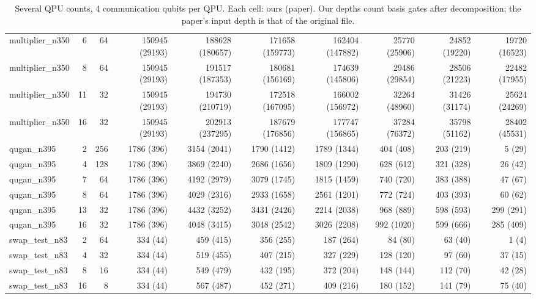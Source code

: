 \begin{table}[ht]
\begin{tabular}{lrrrrrrrrr}
multiplier\_n350 & 6 & 64 & 150945 (29193) & 188628 (180657) & 171658 (159773) & 162404 (147882) & 25770 (25906) & 24852 (19220) & 19720 (16523) \\
multiplier\_n350 & 8 & 64 & 150945 (29193) & 191517 (187353) & 180681 (156169) & 174639 (145806) & 29486 (29854) & 28506 (21223) & 22482 (17955) \\
multiplier\_n350 & 11 & 32 & 150945 (29193) & 194730 (210719) & 172518 (167095) & 166002 (156972) & 32264 (48960) & 31426 (31174) & 25624 (24269) \\
multiplier\_n350 & 16 & 32 & 150945 (29193) & 202913 (237295) & 187679 (176856) & 177747 (156865) & 37284 (76372) & 35798 (51162) & 28402 (45531) \\
qugan\_n395 & 2 & 256 & 1786 (396) & 3154 (2041) & 1790 (1412) & 1789 (1344) & 404 (408) & 203 (219) & 5 (29) \\
qugan\_n395 & 4 & 128 & 1786 (396) & 3869 (2240) & 2686 (1656) & 1809 (1290) & 628 (612) & 321 (328) & 26 (42) \\
qugan\_n395 & 7 & 64 & 1786 (396) & 4192 (2979) & 3079 (1745) & 1815 (1459) & 740 (720) & 383 (388) & 47 (67) \\
qugan\_n395 & 8 & 64 & 1786 (396) & 4029 (2316) & 2933 (1658) & 2561 (1201) & 772 (724) & 403 (393) & 60 (62) \\
qugan\_n395 & 13 & 32 & 1786 (396) & 4432 (3252) & 3431 (2426) & 2214 (2038) & 968 (889) & 598 (593) & 299 (291) \\
qugan\_n395 & 16 & 32 & 1786 (396) & 4048 (3415) & 3048 (2542) & 3026 (2208) & 992 (1020) & 599 (666) & 285 (409) \\
swap\_test\_n83 & 2 & 64 & 334 (44) & 459 (415) & 356 (255) & 187 (264) & 84 (80) & 63 (40) & 1 (4) \\
swap\_test\_n83 & 4 & 32 & 334 (44) & 519 (455) & 407 (215) & 327 (229) & 128 (120) & 97 (60) & 37 (15) \\
swap\_test\_n83 & 8 & 16 & 334 (44) & 549 (479) & 432 (195) & 372 (204) & 148 (144) & 112 (70) & 42 (28) \\
swap\_test\_n83 & 16 & 8 & 334 (44) & 567 (487) & 452 (271) & 409 (216) & 180 (152) & 141 (79) & 75 (40) \\
\hline
\end{tabular}
\caption{Several QPU counts, 4 communication qubits per QPU. Each cell: ours (paper). Our depths count basis gates after decomposition; the paper's input depth is that of the original file.}
\end{table}
